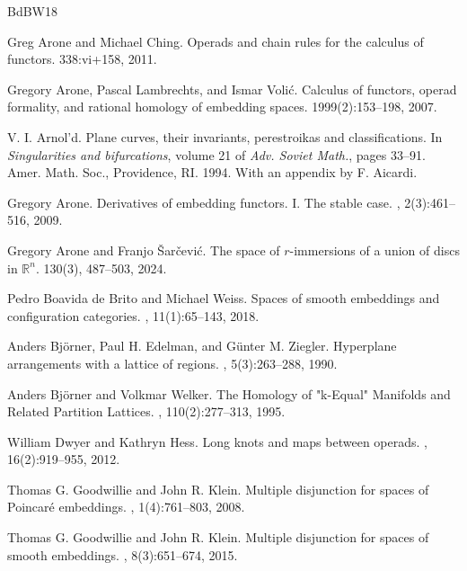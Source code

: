 \documentclass[12pt]{amsart}
\theoremstyle{plain}
\theoremstyle{definition}
\theoremstyle{remark}
\begin{document}
\begin{thebibliography}{BdBW18}

Greg Arone and Michael Ching.
\newblock Operads and chain rules for the calculus of functors.
 338:vi+158, 2011.

Gregory Arone, Pascal Lambrechts, and Ismar Voli\'{c}.
\newblock Calculus of functors, operad formality, and rational homology of embedding spaces.
 1999(2):153--198, 2007.

V. I. Arnol'd.
\newblock Plane curves, their invariants, perestroikas and classifications.
\newblock In {\em Singularities and bifurcations}, volume 21 of {\em Adv. Soviet Math.}, pages 33--91. Amer. Math. Soc., Providence, RI. 1994. With an appendix by F. Aicardi.

Gregory Arone.
\newblock Derivatives of embedding functors. {I}. {T}he stable case.
, 2(3):461--516, 2009.

Gregory Arone and Franjo {\v S}ar{\v c}evi{\'c}.
\newblock The space of $r$-immersions of a union of discs in $\mathbb{R}^n$.
 130(3), 487--503, 2024.

Pedro Boavida de Brito and Michael Weiss.
\newblock Spaces of smooth embeddings and configuration categories.
, 11(1):65--143, 2018.

Anders Bj{\"o}rner, Paul H. Edelman, and G{\"u}nter M. Ziegler.
\newblock Hyperplane arrangements with a lattice of regions.
, 5(3):263--288, 1990.

Anders Bj{\"o}rner and Volkmar Welker.
\newblock The Homology of "k-Equal" Manifolds and Related Partition Lattices.
, 110(2):277--313, 1995.

William Dwyer and Kathryn Hess.
\newblock Long knots and maps between operads.
, 16(2):919--955, 2012.

Thomas G. Goodwillie and John R. Klein.
\newblock Multiple disjunction for spaces of {P}oincar\'e embeddings.
, 1(4):761--803, 2008.

Thomas G. Goodwillie and John R. Klein.
\newblock Multiple disjunction for spaces of smooth embeddings.
, 8(3):651--674, 2015.


\end{thebibliography}
\end{document}
